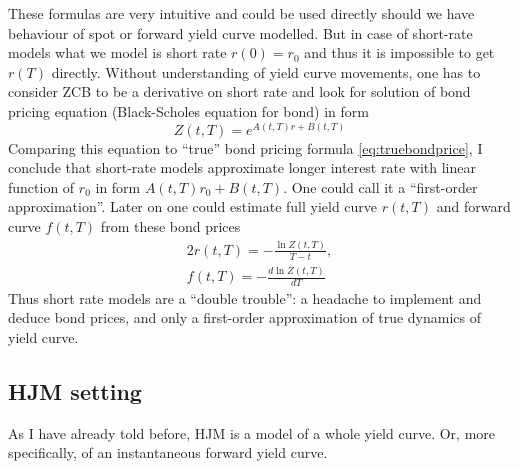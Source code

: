 \documentclass[11pt]{article} %
\begin{document}
These formulas are very intuitive and could be used directly should we have behaviour of spot or forward yield curve modelled. But in case of short-rate models what we model is short rate $r(0) = r_0$ and thus it is impossible to get $r(T)$ directly. Without understanding of yield curve movements, one has to consider ZCB to be a derivative on short rate and look for solution of bond pricing equation (Black-Scholes equation for bond) in form 
\begin{equation} 
Z(t,T) = e^{A(t,T) r + B(t,T)}
\end{equation}
Comparing this equation to ``true'' bond pricing formula \eqref{eq:truebondprice}, I conclude that short-rate models approximate longer interest rate with linear function of $r_0$ in form $A(t,T) r_0 + B(t,T)$. One could call it a ``first-order approximation''. Later on one could estimate full yield curve $r(t,T)$ and forward curve $f(t,T)$ from these bond prices
\begin{alignat}{2}
r(t,T) = -\frac{\ln Z(t,T)}{T-t},\\
\label{eq:fwdfrombond} f(t,T) = -\frac{d \ln Z(t,T)}{dT}
\end{alignat}
Thus short rate models are a ``double trouble'': a headache to implement and deduce bond prices, and only a first-order approximation of true dynamics of yield curve.\\

\subsection{HJM setting}

As I have already told before, HJM is a model of a whole yield curve. Or, more specifically, of an instantaneous forward yield curve.\\
\end{document}
